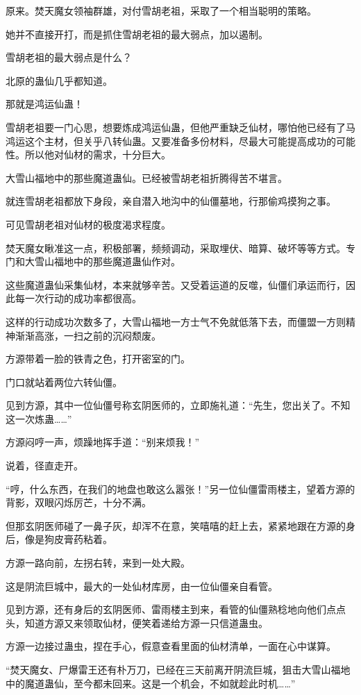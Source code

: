 \begin{this_body}
原来。焚天魔女领袖群雄，对付雪胡老祖，采取了一个相当聪明的策略。

她并不直接开打，而是抓住雪胡老祖的最大弱点，加以遏制。

雪胡老祖的最大弱点是什么？

北原的蛊仙几乎都知道。

那就是鸿运仙蛊！

雪胡老祖要一门心思，想要炼成鸿运仙蛊，但他严重缺乏仙材，哪怕他已经有了马鸿运这个主材，但关乎八转仙蛊。又要准备多份材料，尽最大可能提高成功的可能性。所以他对仙材的需求，十分巨大。

大雪山福地中的那些魔道蛊仙。已经被雪胡老祖折腾得苦不堪言。

就连雪胡老祖都放下身段，亲自潜入地沟中的仙僵墓地，行那偷鸡摸狗之事。

可见雪胡老祖对仙材的极度渴求程度。

焚天魔女瞅准这一点，积极部署，频频调动，采取埋伏、暗算、破坏等等方式。专门和大雪山福地中的那些魔道蛊仙作对。

这些魔道蛊仙采集仙材，本来就够辛苦。又受着运道的反噬，仙僵们承运而行，因此每一次行动的成功率都很高。

这样的行动成功次数多了，大雪山福地一方士气不免就低落下去，而僵盟一方则精神渐渐高涨，一扫之前的沉闷颓废。

方源带着一脸的铁青之色，打开密室的门。

门口就站着两位六转仙僵。

见到方源，其中一位仙僵号称玄阴医师的，立即施礼道：“先生，您出关了。不知这一次炼蛊……”

方源闷哼一声，烦躁地挥手道：“别来烦我！”

说着，径直走开。

“哼，什么东西，在我们的地盘也敢这么嚣张！”另一位仙僵雷雨楼主，望着方源的背影，双眼闪烁厉芒，十分不满。

但那玄阴医师碰了一鼻子灰，却浑不在意，笑嘻嘻的赶上去，紧紧地跟在方源的身后，像是狗皮膏药粘着。

方源一路向前，左拐右转，来到一处大殿。

这是阴流巨城中，最大的一处仙材库房，由一位仙僵亲自看管。

见到方源，还有身后的玄阴医师、雷雨楼主到来，看管的仙僵熟稔地向他们点点头，知道方源又来领取仙材，便笑着递给方源一只信道蛊虫。

方源一边接过蛊虫，捏在手心，假意查看里面的仙材清单，一面在心中谋算。

“焚天魔女、尸爆雷王还有朴万刀，已经在三天前离开阴流巨城，狙击大雪山福地中的魔道蛊仙，至今都未回来。这是一个机会，不如就趁此时机……”


\end{this_body}

